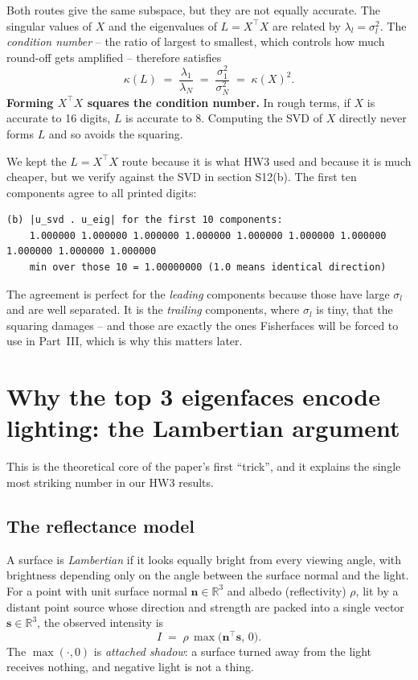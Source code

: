 \documentclass[11pt]{article}
\theoremstyle{definition}
\theoremstyle{remark}
\newcommand{\R}{\mathbb{R}}
\begin{document}
Both routes give the same subspace, but they are not equally accurate. The
singular values of $X$ and the eigenvalues of $L=X^{\!\top}\!X$ are related by
$\lambda_l = \sigma_l^2$. The \emph{condition number} -- the ratio of largest to
smallest, which controls how much round-off gets amplified -- therefore satisfies
\[
  \kappa(L) \;=\; \frac{\lambda_1}{\lambda_N} \;=\; \frac{\sigma_1^2}{\sigma_N^2}
  \;=\; \kappa(X)^2 .
\]
\textbf{Forming $X^{\!\top}\!X$ squares the condition number.} In rough terms, if $X$
is accurate to 16 digits, $L$ is accurate to 8. Computing the SVD of $X$ directly
never forms $L$ and so avoids the squaring.

We kept the $L=X^{\!\top}\!X$ route because it is what HW3 used and because it is much
cheaper, but we verify against the SVD in section S12(b). The first ten components
agree to all printed digits:
\begin{lstlisting}
(b) |u_svd . u_eig| for the first 10 components:
    1.000000 1.000000 1.000000 1.000000 1.000000 1.000000 1.000000 1.000000 1.000000 1.000000
    min over those 10 = 1.00000000 (1.0 means identical direction)
\end{lstlisting}
The agreement is perfect for the \emph{leading} components because those have large
$\sigma_l$ and are well separated. It is the \emph{trailing} components, where
$\sigma_l$ is tiny, that the squaring damages -- and those are exactly the ones
Fisherfaces will be forced to use in Part~III, which is why this matters later.

\section{Why the top 3 eigenfaces encode lighting: the Lambertian argument}
\label{sec:lambert}

This is the theoretical core of the paper's first ``trick'', and it explains the
single most striking number in our HW3 results.

\subsection{The reflectance model}

A surface is \emph{Lambertian} if it looks equally bright from every viewing angle,
with brightness depending only on the angle between the surface normal and the
light. For a point with unit surface normal $\mathbf{n}\in\R^3$ and albedo
(reflectivity) $\rho$, lit by a distant point source whose direction and strength
are packed into a single vector $\mathbf{s}\in\R^3$, the observed intensity is
\[
  I \;=\; \rho \,\max\bigl(\mathbf{n}^{\!\top}\mathbf{s},\,0\bigr).
\]
The $\max(\cdot,0)$ is \emph{attached shadow}: a surface turned away from the light
receives nothing, and negative light is not a thing.
\end{document}
